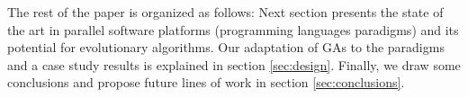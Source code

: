 The rest of the paper is organized as follows: Next section presents the state of the art in parallel software platforms (programming languages paradigms) and its potential for evolutionary algorithms. Our adaptation of GAs to the paradigms and a case study results is explained in section \ref{sec:design}. Finally, we draw some conclusions and propose future lines of work in section \ref{sec:conclusions}. 